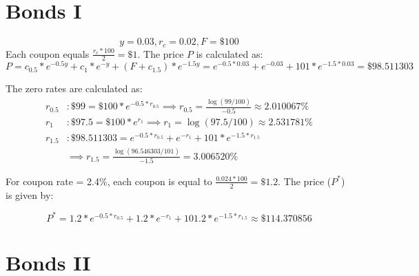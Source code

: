 \documentclass{article}
\begin{document}
\begin{table}[H]
	\begin{center}
\end{center}
\end{table}

\section{Bonds I}

$$ y=0.03, r_c = 0.02, F=\$100$$
Each coupon equals $\frac{r_c * 100}{2} = \$1$. The price $P$ is calculated as:
$$P = c_{0.5} * e^{-0.5y} + c_{1} * e^{-y} + (F+c_{1.5}) * e^{-1.5y} = e^{-0.5*0.03} + e^{-0.03} + 101 * e^{-1.5*0.03} = \$98.511303$$

The zero rates are calculated as:
\begin{align*}
	r_{0.5} &: \$99 = \$100*e^{-0.5*r_{0.5}} \implies r_{0.5} = \frac{\log\left(99/100\right)}{-0.5} \approx 2.010067\%\\
	r_{1} &: \$97.5 = \$100*e^{r_{1}} \implies r_{1} = \log\left(97.5/100\right) \approx 2.531781 \% \\
	r_{1.5} &: \$98.511303 = e^{-0.5 * r_{0.5}} + e^{-r_1} + 101*e^{-1.5*r_{1.5}} \\
	& \implies r_{1.5} = \frac{ \log\left( 96.546303 / 101 \right)}{-1.5} = 3.006520 \%
\end{align*}

For coupon rate = 2.4\%, each coupon is equal to $\frac{0.024 * 100}{2} = \$1.2$. The price ($P^*$) is given by:

$$P^* = 1.2 * e^{-0.5*r_{0.5}} + 1.2 * e^{-r_1} + 101.2 * e^{-1.5*r_{1.5}} \approx \$114.370856 $$


\section{Bonds II}
\end{document}
